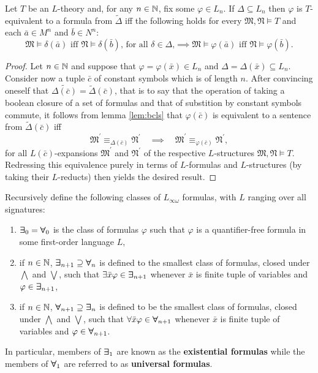 \begin{prp}\label{prp:bcls}
	Let $T$ be an $L$-theory and, for any $n\in\mathbb{N}$, fix some $\varphi\in L_n$.  If $\Delta\subseteq L_n$ then $\varphi$ is $T$-equivalent to a formula from $\widetilde{\Delta}$ iff the following holds for every $\mathfrak{M},\mathfrak{N}\models T$ and each $\bar{a}\in M^n$ and $\bar{b}\in N^n$:
	\begin{equation}
		 \mathfrak{M}\models\delta(\bar{a})\text{ iff }\mathfrak{N}\models\delta(\bar{b})\text{, for all $\delta\in\Delta$,} \implies \mathfrak{M}\models\varphi(\bar{a})\text{ iff }\mathfrak{N}\models\varphi(\bar{b}).
	\end{equation}
\end{prp}
\begin{proof}
	Let $n\in\mathbb{N}$ and suppose that $\varphi=\varphi(\bar{x})\in L_n$ and $\Delta=\Delta(\bar{x})\subseteq L_n$.  Consider now a tuple $\bar{c}$ of constant symbols which is of length $n$.  After convincing oneself that $\widetilde{\Delta(\bar{c})}=\widetilde{\Delta}(\bar{c})$, that is to say that the operation of taking a boolean closure of a set of formulas and that of substition by constant symbols commute, it follows from lemma \ref{lem:bcls} that $\varphi(\bar{c})$ is equivalent to a sentence from $\widetilde{\Delta}(\bar{c})$ iff
	\begin{equation}
		\mathfrak{M}^\prime\equiv_{\Delta(\bar{c})}\mathfrak{N}^\prime \quad\implies\quad \mathfrak{M}^\prime\equiv_{\varphi(\bar{c})}\mathfrak{N}^\prime,
	\end{equation}
	for all $L(\bar{c})$-expansions $\mathfrak{M}^\prime$ and $\mathfrak{N}^\prime$ of the respective $L$-structures $\mathfrak{M},\mathfrak{N}\models T$.  Redressing this equivalence purely in terms of $L$-formulas and $L$-structures (by taking their $L$-reducts) then yields the desired result.
\end{proof}

\begin{dfn}
	Recursively define the following classes of $L_{\infty\omega}$ formulas, with $L$ ranging over all signatures:
	\begin{enumerate}
		\item	$\bm{\exists}_{0}=\bm{\forall}_{0}$ is the class of formulas $\varphi$ such that $\varphi$ is a quantifier-free formula in some first-order language $L$,
		\item	if $n\in\mathbb{N}$, $\bm{\exists}_{n+1}\supseteq\bm{\forall}_{n}$ is defined to the smallest class of formulas, closed under $\bigwedge$ and $\bigvee$, such that $\exists\bar{x}\varphi\in\bm{\exists}_{n+1}$ whenever $\bar{x}$ is finite tuple of variables and $\varphi\in\bm{\exists}_{n+1}$,
		\item	if $n\in\mathbb{N}$, $\bm{\forall}_{n+1}\supseteq\bm{\exists}_{n}$ is defined to be the smallest class of formulas, closed under $\bigwedge$ and $\bigvee$, such that $\forall\bar{x}\varphi\in\bm{\forall}_{n+1}$ whenever $\bar{x}$ is finite tuple of variables and $\varphi\in\bm{\forall}_{n+1}$.
	\end{enumerate}
	In particular, members of $\bm{\exists}_{1}$ are known as the \textbf{existential formulas} while the members of $\bm{\forall}_{1}$ are referred to as \textbf{universal formulas}.
\end{dfn}

